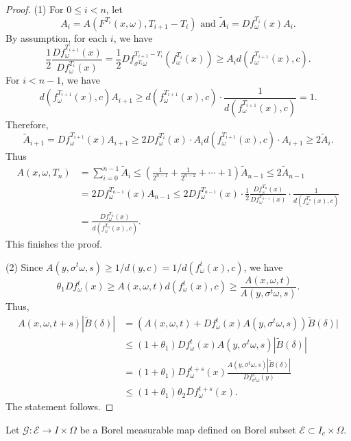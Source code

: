 \documentclass[11pt,oneside]{article}
\theoremstyle{plain}
\numberwithin{equation}{section}
\numberwithin{figure}{section}
\numberwithin{table}{section}
\begin{document}
\begin{proof}

(1) For $0 \leq i < n$, let
\[
A_i = A(F^{T_i} (x, \omega), T_{i+1} -T_i) \mbox{ and \ } \tilde A_i =  Df_{\omega}^{T_i} (x) A_i.
\]
By assumption, for each $i$, we have
\[
\frac{1}{2} \frac{Df_{\omega}^{T_{i+1}}(x)}{Df_{\omega}^{T_i}(x)} = \frac{1}{2}  Df_{\sigma^{T_i}\omega}^{T_{i+1}-T_i}(f_{\omega}^{T_i}(x)) \geq A_i d(f_{\omega}^{T_{i+1}}(x), c).
\]
For $i < n-1$, we have
\[
d(f_{\omega}^{T_{i+1}}(x), c) A_{i+1}  \geq d(f_{\omega}^{T_{i+1}}(x), c) \cdot \frac{1}{d(f_{\omega}^{T_{i+1}}(x), c)} = 1.
\]
Therefore,
\[
\tilde A_{i+1} = Df_{\omega}^{T_{i+1}}(x) A_{i+1} \geq 2 Df_{\omega}^{T_i}(x) \cdot A_i d(f_{\omega}^{T_{i+1}}(x), c) \cdot A_{i+1} \geq 2 \tilde A_i.
\]
Thus 
\begin{align*}
A(x, \omega, T_n) & = \sum_{i=0}^{n-1} \tilde A_i \leq \left( \frac{1}{2^{n-1}} + \frac{1}{2^{n-2}} + \cdots + 1 \right) \tilde A_{n-1} \leq 2  \tilde A_{n-1}\\
& = 2 Df_{\omega}^{T_{n-1}}(x) A_{n-1} \leq 2 Df_{\omega}^{T_{n-1}}(x) \cdot \frac{1}{2} \frac{Df_{\omega}^{T_{n}}(x)}{Df_{\omega}^{T_{n-1}}(x)} \cdot \frac{1}{d(f_{\omega}^{T_n}(x), c)}\\
& = \frac{Df_{\omega}^{T_{n}}(x)}{d(f_{\omega}^{T_n}(x), c)}.
\end{align*}
This finishes the proof.


(2) Since $A(y, \sigma^t \omega, s) \geq  1 /d(y, c) = 1/d(f_{\omega}^t(x), c)$, we have
\[
\theta_1 Df_{\omega}^t (x) \geq A(x, \omega, t) d(f_{\omega}^t(x), c) \geq \frac{ A(x, \omega, t)}{A(y, \sigma^t \omega, s)}.
\]
Thus,
\begin{align*}
A(x, \omega, t+s)  |\tilde B(\delta)|& = (A(x, \omega, t) + Df_{\omega}^t(x) A(y, \sigma^t \omega, s)  )\tilde B(\delta)|\\
& \leq (1+\theta_1) Df_{\omega}^t(x) A(y, \sigma^t \omega, s) |\tilde B(\delta)| \\
& = (1 + \theta_1) Df_{\omega}^{t+s}(x) \frac{ A(y, \sigma^t \omega, s) |\tilde B(\delta)| }{D f_{\sigma^t \omega}^s(y)} \\
& \leq (1 + \theta_1) \theta_2 Df_{\omega}^{t+s}(x).
\end{align*}
The statement follows.

\end{proof}


Let $\mathscr G: \mathcal E \to I \times \Omega$ be a Borel measurable map defined on Borel subset $\mathcal E \subset I_c \times \Omega$.
\end{document}

